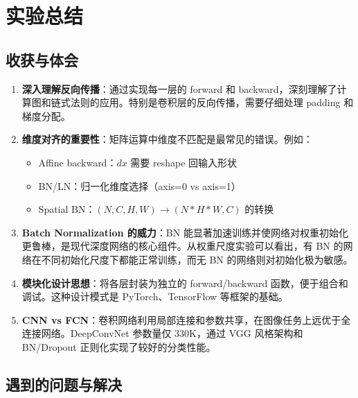 \documentclass[a4paper]{article}
\begin{document}
\section{实验总结}

\subsection{收获与体会}

\begin{enumerate}
    \item \textbf{深入理解反向传播}：通过实现每一层的 forward 和 backward，深刻理解了计算图和链式法则的应用。特别是卷积层的反向传播，需要仔细处理 padding 和梯度分配。
    
    \item \textbf{维度对齐的重要性}：矩阵运算中维度不匹配是最常见的错误。例如：
    \begin{itemize}
        \item Affine backward：$dx$ 需要 reshape 回输入形状
        \item BN/LN：归一化维度选择（axis=0 vs axis=1）
        \item Spatial BN：$(N,C,H,W) \to (N*H*W,C)$ 的转换
    \end{itemize}
    
    \item \textbf{Batch Normalization 的威力}：BN 能显著加速训练并使网络对权重初始化更鲁棒，是现代深度网络的核心组件。从权重尺度实验可以看出，有 BN 的网络在不同初始化尺度下都能正常训练，而无 BN 的网络则对初始化极为敏感。
    
    \item \textbf{模块化设计思想}：将各层封装为独立的 forward/backward 函数，便于组合和调试。这种设计模式是 PyTorch、TensorFlow 等框架的基础。
    
    \item \textbf{CNN vs FCN}：卷积网络利用局部连接和参数共享，在图像任务上远优于全连接网络。DeepConvNet 参数量仅 330K，通过 VGG 风格架构和 BN/Dropout 正则化实现了较好的分类性能。
\end{enumerate}

\subsection{遇到的问题与解决}
\end{document}
